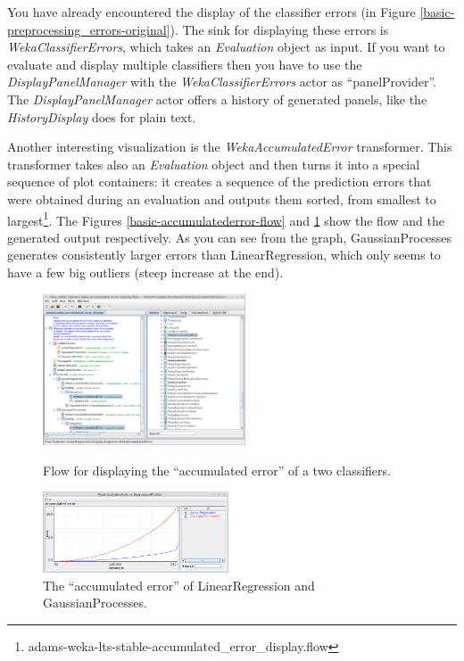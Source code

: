 You have already encountered the display of the classifier errors (in Figure
\ref{basic-preprocessing_errors-original}). The sink for displaying these errors
is \textit{WekaClassifierErrors}, which takes an \textit{Evaluation} object as
input. If you want to evaluate and display multiple classifiers then you have to
use the \textit{DisplayPanelManager} with the \textit{WekaClassifierErrors}
actor as ``panelProvider''. The \textit{DisplayPanelManager} actor offers a
history of generated panels, like the \textit{HistoryDisplay} does for plain
text.

Another interesting visualization is the \textit{WekaAccumulatedError}
transformer. This transformer takes also an \textit{Evaluation} object and then
turns it into a special sequence of plot containers: it creates a sequence of
the prediction errors that were obtained during an evaluation and outputs them
sorted, from smallest to
largest\footnote{adams-weka-lts-stable-accumulated\_error\_display.flow}. The Figures
\ref{basic-accumulatederror-flow} and \ref{basic-accumulatederror-output} show
the flow and the generated output respectively. As you can see from the graph,
GaussianProcesses generates consistently larger errors than LinearRegression,
which only seems to have a few big outliers (steep increase at the end).

\begin{figure}[ht]
  \begin{minipage}[t]{0.5\linewidth}
    \centering
    \includegraphics[width=6.0cm]{images/basic-accumulatederror-flow.png}
    \caption{Flow for displaying the ``accumulated error'' of a two
    classifiers.}
    \label{basic-accumulatederror-flow}
  \end{minipage}
  \hspace{0.5cm}
  \begin{minipage}[t]{0.5\linewidth}
    \centering
    \includegraphics[width=5.5cm]{images/basic-accumulatederror-output.png}
    \caption{The ``accumulated error'' of LinearRegression and
    GaussianProcesses.}
    \label{basic-accumulatederror-output}
  \end{minipage}
\end{figure}

